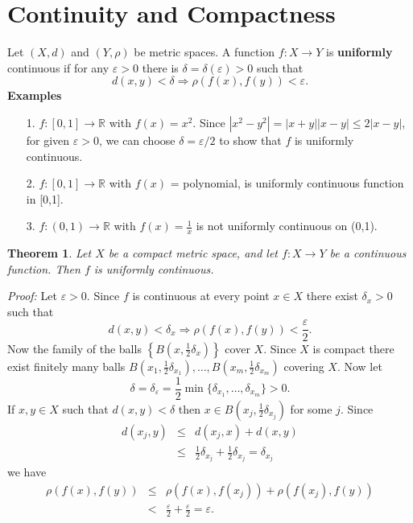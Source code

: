 \documentclass[12pt]{report}
\newtheorem{theorem}{Theorem}[section]
\begin{document}
\section{Continuity and Compactness}
Let $(X, d)$ and $(Y, \rho)$ be metric spaces.  A function $f: X
\longrightarrow Y$ is
\textbf{uniformly} continuous if for any $\varepsilon > 0 $ there is
$\delta =
\delta (\varepsilon) > 0$ such that
\[ d(x, y) < \delta \Longrightarrow \rho(f(x), f(y)) < \varepsilon.
\]
\textbf{Examples} 
\begin{itemize}

\item[1. ] $f:[0,1] \longrightarrow \mathbb{R}$ with $f(x)=x^2$.
Since $|x^2-y^2|=|x+y||x-y|\le 2|x-y|$, for given  $\varepsilon > 0 $,
we can choose  $\delta=\varepsilon/2$ to show that $f$ is uniformly
continuous.
\item[2. ] $f:[0,1] \longrightarrow \mathbb{R}$ with $f(x) $ =
polynomial,  is uniformly  continuous function in [0,1].
\item[3. ]  $f: (0,1) \longrightarrow \mathbb{R}$ with $f(x) =
\frac{1}{x}$ is not  uniformly continuous on (0,1).
\end{itemize}

\begin{theorem} 
\label{th:cont-comp}
 Let $X$ be a compact metric space, and
let $f: X
\longrightarrow Y$ be a continuous function.  Then $f$ is uniformly
continuous.
\end{theorem}
\textit{Proof:}  
Let $\varepsilon > 0$. Since $f$ is continuous at every
point $x \in X$ there exist $\delta_x > 0 $ such that
\[ d(x, y) < \delta_x \Longrightarrow \rho(f(x), f(y)) <
\frac{\varepsilon}{2}.
\] Now the family of the balls $\left \{B\left ( x, \frac{1}{2}
\delta_x\right )\right \}$ cover
$X$.   Since $X$ is compact there exist finitely many balls $B\left
(x_1, \frac{1}{2}
\delta_{x_1}\right ), \dots, B\left (x_m, \frac{1}{2}
\delta_{x_m}\right )$ covering
$X$.  Now let
\[
\delta = \delta_\varepsilon = \frac{1}{2} \min \{\delta_{x_1}, \dots,
\delta_{x_m}\} > 0.
\] If $x, y \in X$ such that $d(x, y) < \delta$ then $x \in B \left (x_j,
\frac{1}{2}
\delta_{x_j}\right )$ for some $j$.  Since
\begin{eqnarray*} d(x_j, y) &\le& d(x_j, x) + d(x, y) \\ &\le&
\frac{1}{2} \delta_{x_j} + \frac{1}{2} \delta_{x_j} =\delta_{x_j}
\end{eqnarray*} 
we have
\begin{eqnarray*}
\rho(f(x), f(y)) &\le& \rho(f(x), f(x_j)) + \rho(f(x_j), f(y))\\
&<&\frac{\varepsilon}{2} + \frac{\varepsilon}{2} = \varepsilon.
\end{eqnarray*}
\end{document}

